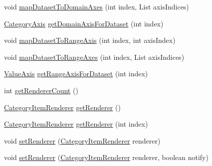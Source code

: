 \begin{DoxyCompactItemize}
void \mbox{\hyperlink{classorg_1_1jfree_1_1chart_1_1plot_1_1_category_plot_a8fc92a87b8a93257ba9bd933d6680e2d}{map\+Dataset\+To\+Domain\+Axes}} (int index, List axis\+Indices)
\item 
\mbox{\hyperlink{classorg_1_1jfree_1_1chart_1_1axis_1_1_category_axis}{Category\+Axis}} \mbox{\hyperlink{classorg_1_1jfree_1_1chart_1_1plot_1_1_category_plot_a4867d8ae8d451d59732abf6bcfce58ee}{get\+Domain\+Axis\+For\+Dataset}} (int index)
\item 
void \mbox{\hyperlink{classorg_1_1jfree_1_1chart_1_1plot_1_1_category_plot_a99162f519931f2553fb014dd0fe174e2}{map\+Dataset\+To\+Range\+Axis}} (int index, int axis\+Index)
\item 
void \mbox{\hyperlink{classorg_1_1jfree_1_1chart_1_1plot_1_1_category_plot_a313f9a39fc7b91d05be08023fbad177c}{map\+Dataset\+To\+Range\+Axes}} (int index, List axis\+Indices)
\item 
\mbox{\hyperlink{classorg_1_1jfree_1_1chart_1_1axis_1_1_value_axis}{Value\+Axis}} \mbox{\hyperlink{classorg_1_1jfree_1_1chart_1_1plot_1_1_category_plot_a23f209e7a7eb1f7370c361cd78cb6d68}{get\+Range\+Axis\+For\+Dataset}} (int index)
\item 
int \mbox{\hyperlink{classorg_1_1jfree_1_1chart_1_1plot_1_1_category_plot_ac64a1930a3901a554a67dd1be9ce52e5}{get\+Renderer\+Count}} ()
\item 
\mbox{\hyperlink{interfaceorg_1_1jfree_1_1chart_1_1renderer_1_1category_1_1_category_item_renderer}{Category\+Item\+Renderer}} \mbox{\hyperlink{classorg_1_1jfree_1_1chart_1_1plot_1_1_category_plot_aa00ab3d14f76887f00095323f2538d14}{get\+Renderer}} ()
\item 
\mbox{\hyperlink{interfaceorg_1_1jfree_1_1chart_1_1renderer_1_1category_1_1_category_item_renderer}{Category\+Item\+Renderer}} \mbox{\hyperlink{classorg_1_1jfree_1_1chart_1_1plot_1_1_category_plot_abf90ab29e7c3ddb968f7668e0f697725}{get\+Renderer}} (int index)
\item 
void \mbox{\hyperlink{classorg_1_1jfree_1_1chart_1_1plot_1_1_category_plot_ac375aaa8e79ffb62fab2a94cdf5c2217}{set\+Renderer}} (\mbox{\hyperlink{interfaceorg_1_1jfree_1_1chart_1_1renderer_1_1category_1_1_category_item_renderer}{Category\+Item\+Renderer}} renderer)
\item 
void \mbox{\hyperlink{classorg_1_1jfree_1_1chart_1_1plot_1_1_category_plot_a12b7397d6ce4aeee471f05c3d37cb711}{set\+Renderer}} (\mbox{\hyperlink{interfaceorg_1_1jfree_1_1chart_1_1renderer_1_1category_1_1_category_item_renderer}{Category\+Item\+Renderer}} renderer, boolean notify)

\end{DoxyCompactItemize}
